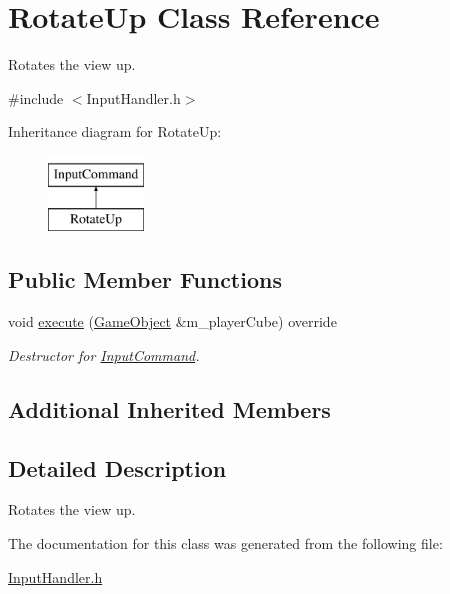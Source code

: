\hypertarget{class_rotate_up}{}\section{Rotate\+Up Class Reference}
\label{class_rotate_up}


Rotates the view up.  




{\ttfamily \#include $<$Input\+Handler.\+h$>$}

Inheritance diagram for Rotate\+Up\+:\begin{figure}[H]
\begin{center}
\leavevmode
\includegraphics[height=2.000000cm]{class_rotate_up}
\end{center}
\end{figure}
\subsection*{Public Member Functions}
\begin{DoxyCompactItemize}
\item 
\mbox{\label{class_rotate_up_ae3cb95f4a3a93d078b0367221ed89c28}} 
void \mbox{\hyperlink{class_rotate_up_ae3cb95f4a3a93d078b0367221ed89c28}{execute}} (\mbox{\hyperlink{class_game_object}{Game\+Object}} \&m\+\_\+player\+Cube) override
\begin{DoxyCompactList}\small\item\em Destructor for \mbox{\hyperlink{class_input_command}{Input\+Command}}. \end{DoxyCompactList}\end{DoxyCompactItemize}
\subsection*{Additional Inherited Members}


\subsection{Detailed Description}
Rotates the view up. 

The documentation for this class was generated from the following file\+:\begin{DoxyCompactItemize}
\item 
\mbox{\hyperlink{_input_handler_8h}{Input\+Handler.\+h}}\end{DoxyCompactItemize}
